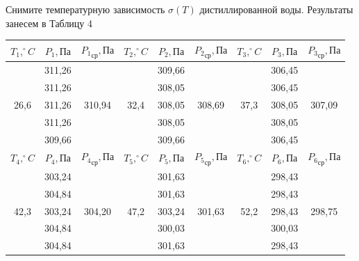 \documentclass[a4paper,12pt]{article}
\theoremstyle{plain} %
\theoremstyle{definition} %
\theoremstyle{remark} %
\begin{document}
	Снимите температурную зависимость $\sigma (T)$ дистиллированной воды. Результаты занесем в Таблицу 4
	\begin{table}[H]
		\begin{center}
		\begin{tabular}{|c|c|c||c|c|c||c|c|c|}
			\hline
			$T_1, ^{\circ} C$    & $P_1, \text{Па}$      & ${P_1}_\text{ср}, \text{Па}$      & $T_2, ^{\circ} C$    & $P_2, \text{Па}$      & ${P_2}_\text{ср}, \text{Па}$          & $T_3, ^{\circ} C$    & $P_3, \text{Па}$          & ${P_3}_\text{ср}, \text{Па}$          \\ \hline
			\multirow{5}{*}{26,6} & 311,26 & 	\multirow{5}{*}{310,94} & 	\multirow{5}{*}{32,4} & 309,66 & 	\multirow{5}{*}{308,69} & 	\multirow{5}{*}{37,3} & 306,45 & 	\multirow{5}{*}{307,09} \\ \cline{2-2} \cline{5-5} \cline{8-8}
			& 311,26 &        &      & 308,05 &            &      & 306,45 &            \\ \cline{2-2} \cline{5-5} \cline{8-8}
			& 311,26 &        &      & 308,05 &            &      & 308,05 &            \\ \cline{2-2} \cline{5-5} \cline{8-8}
			& 311,26 &        &      & 308,05 &            &      & 308,05 &            \\ \cline{2-2} \cline{5-5} \cline{8-8}
			& 309,66 &        &      & 309,66 &            &      & 306,45 &            \\ \hline \hline
			$T_4, ^{\circ} C$    & $P_4, \text{Па}$      & ${P_4}_\text{ср}, \text{Па}$      & $T_5, ^{\circ} C$    & $P_5, \text{Па}$      & ${P_5}_\text{ср}, \text{Па}$          & $T_6, ^{\circ} C$    & ${P_6}, \text{Па}$          & ${P_6}_\text{ср}, \text{Па}$          \\ \hline
			\multirow{5}{*}{42,3} & 303,24 & \multirow{5}{*}{304,20} & \multirow{5}{*}{47,2} & 301,63 & \multirow{5}{*}{301,63} & \multirow{5}{*}{52,2} & 298,43 & \multirow{5}{*}{298,75} \\ \cline{2-2} \cline{5-5} \cline{8-8}
			& 304,84 &        &      & 301,63 &        &      & 298,43 &        \\ \cline{2-2} \cline{5-5} \cline{8-8}
			& 303,24 &        &      & 303,24 &        &      & 298,43 &        \\ \cline{2-2} \cline{5-5} \cline{8-8}
			& 304,84 &        &      & 300,03 &        &      & 300,03 &        \\ \cline{2-2} \cline{5-5} \cline{8-8}
			& 304,84 &        &      & 301,63 &        &      & 298,43 &        \\ \hline \hline

\end{tabular}
\end{center}
\end{table}
\end{document}
